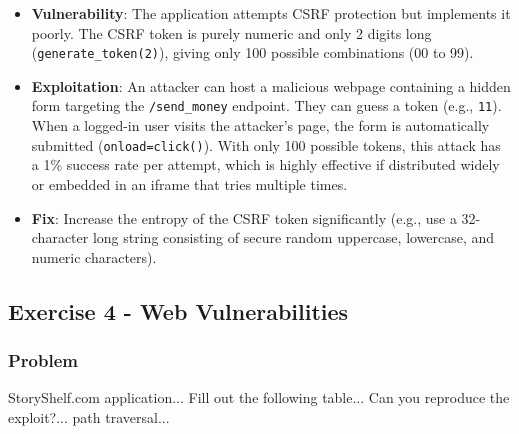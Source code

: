 \documentclass{article}
\begin{document}
\begin{itemize}
    \item \textbf{Vulnerability}: The application attempts CSRF protection but implements it poorly. The CSRF token is purely numeric and only 2 digits long (\texttt{generate\_token(2)}), giving only 100 possible combinations (00 to 99).
    \item \textbf{Exploitation}: An attacker can host a malicious webpage containing a hidden form targeting the \texttt{/send\_money} endpoint. They can guess a token (e.g., \texttt{11}). When a logged-in user visits the attacker's page, the form is automatically submitted (\texttt{onload=click()}). With only 100 possible tokens, this attack has a 1\% success rate per attempt, which is highly effective if distributed widely or embedded in an iframe that tries multiple times.
    \item \textbf{Fix}: Increase the entropy of the CSRF token significantly (e.g., use a 32-character long string consisting of secure random uppercase, lowercase, and numeric characters).
\end{itemize}

\subsection{Exercise 4 - Web Vulnerabilities}
\subsubsection*{Problem}
StoryShelf.com application... Fill out the following table... Can you reproduce the exploit?... path traversal...
\end{document}
